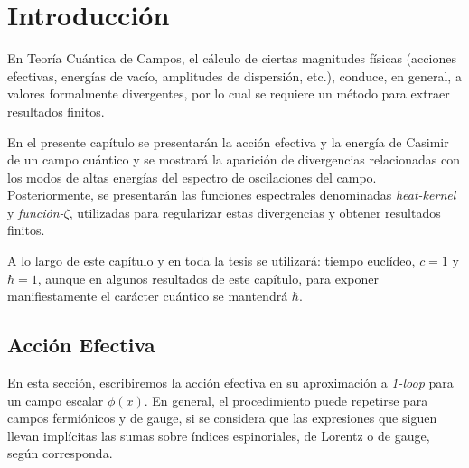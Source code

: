 \chapter{Introducción}


En Teoría Cuántica de Campos, el cálculo de ciertas magnitudes físicas (acciones efectivas, energías de vacío, amplitudes de dispersión, etc.), conduce, en general, a valores formalmente divergentes, por lo cual se requiere un método para extraer resultados finitos. 

En el presente capítulo se presentarán la acción efectiva y la energía de Casimir de un campo cuántico y se mostrará la aparición de divergencias relacionadas con los modos de altas energías del espectro de oscilaciones del campo. Posteriormente, se presentarán las funciones espectrales denominadas {\it heat-kernel} y {\it función-$\zeta$}, utilizadas para regularizar estas divergencias y obtener resultados finitos.

A lo largo de este capítulo y en toda la tesis se utilizará: tiempo euclídeo, $c=1$ y $\hbar =1$, aunque en algunos resultados de este capítulo, para exponer manifiestamente el carácter cuántico se mantendrá $\hbar$.

\section{Acción Efectiva}\label{accion_efectiva}

En esta sección, escribiremos la acción efectiva en su aproximación a {\it 1-loop} para un campo escalar $\phi(x)$. En general, el procedimiento puede repetirse para campos fermiónicos y de gauge, si se considera que las expresiones que siguen llevan implícitas las sumas sobre índices espinoriales, de Lorentz o de gauge, según corresponda.

